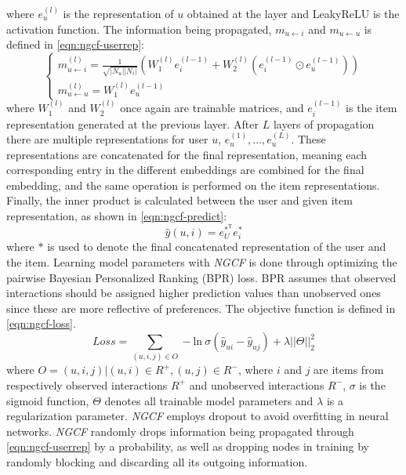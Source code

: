 where $e_u^{(l)}$ is the representation of $u$ obtained at the layer and LeakyReLU is the activation function.
The information being propagated, $m_{u \leftarrow i}$ and $m_{u \leftarrow u}$ is defined in \autoref{eqn:ngcf-userrep}:
\begin{equation}\label{eqn:ngcf-userrep}
  \begin{cases}
    m_{u \leftarrow i}^{(l)} = \frac{1}{\sqrt{|N_u||N_i|}} (W_1^{(l)} e_i^{(l-1)} + W_2^{(l)} (e_i^{(l-1)} \odot e_u^{(l-1)}))\\
    m_{u \leftarrow u}^{(l)} = W_1^{(l)}e_u^{(l-1)}
  \end{cases}
\end{equation}
where $W_1^{(l)}$ and $W_2^{(l)}$ once again are trainable matrices, and $e_i^{(l-1)}$ is the item representation generated at the previous layer.
After $L$ layers of propagation there are multiple representations for user $u$, ${e_u^{(1)},...,e_u^{(L)}}$. These representations are concatenated for the final representation, meaning each corresponding entry in the different embeddings are combined for the final embedding, and the same operation is performed on the item representations.
Finally, the inner product is calculated between the user and given item representation, as shown in \autoref{eqn:ngcf-predict}:
\begin{equation}\label{eqn:ngcf-predict}
  \hat{y}(u, i) = e_U^{*^\textrm{T}} e_i^*
\end{equation}
where $*$ is used to denote the final concatenated representation of the user and the item.
Learning model parameters with \textit{NGCF} is done through optimizing the pairwise Bayesian Personalized Ranking (BPR) loss.
BPR assumes that observed interactions should be assigned higher prediction values than unobserved ones since these are more reflective of preferences.
The objective function is defined in \autoref{eqn:ngcf-loss}.
\begin{equation}\label{eqn:ngcf-loss}
    Loss = \sum_{(u, i, j) \in O} - \textrm{ln} \: \sigma (\hat{y}_{ui} - \hat{y}_{uj}) + \lambda ||\Theta||_2^2
\end{equation}
where $O = {(u, i, j) | (u, i) \in R^+, (u, j) \in R^-}$, where $i$ and $j$ are items from respectively observed interactions $R^+$ and unobserved interactions $R^-$, $\sigma$ is the sigmoid function, $\Theta$ denotes all trainable model parameters and $\lambda$ is a regularization parameter.
\textit{NGCF} employs dropout to avoid overfitting in neural networks.
\textit{NGCF} randomly drops information being propagated through \autoref{eqn:ngcf-userrep} by a probability, as well as dropping nodes in training by randomly blocking and discarding all its outgoing information.
